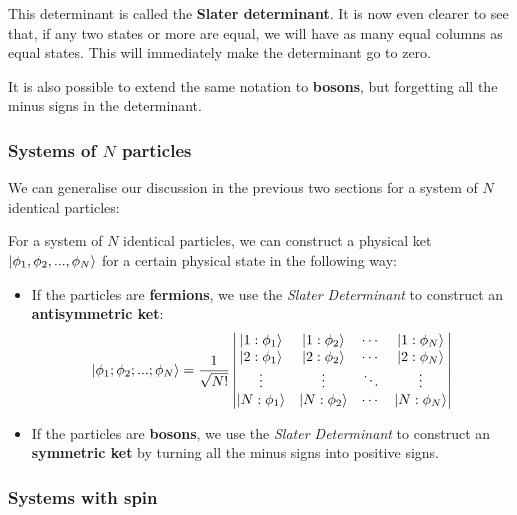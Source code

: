 This determinant is called the \textbf{Slater determinant}. It is now even clearer to see that, if any two states or more are equal, we will have as many equal columns as equal states. This will immediately make the determinant go to zero.

It is also possible to extend the same notation to \textbf{bosons}, but forgetting all the minus signs in the determinant.

\subsubsection{Systems of $N$ particles}

We can generalise our discussion in the previous two sections for a system of $N$ identical particles:

\begin{definition}
    For a system of $N$ identical particles, we can construct a physical ket $\ket{\phi_1,\phi_2,...,\phi_N}$ for a certain physical state in the following way:
    \begin{itemize}
        \item If the particles are \textbf{fermions}, we use the \textit{Slater Determinant} to construct an \textbf{antisymmetric ket}:
        \begin{equation}
            \ket{\phi_1;\phi_2;...;\phi_N} = \frac{1}{\sqrt{N!}}\left|\begin{matrix}
                \ket{1:\phi_1} & \ket{1:\phi_2} & \cdots & \ket{1:\phi_N}\\
                \ket{2:\phi_1} & \ket{2:\phi_2} & \cdots & \ket{2:\phi_N}\\
                \vdots & \vdots & \ddots & \vdots \\
                \ket{N:\phi_1} & \ket{N:\phi_2} & \cdots & \ket{N:\phi_N}\\
            \end{matrix}\right|
        \end{equation}
        \item If the particles are \textbf{bosons}, we use the \textit{Slater Determinant} to construct an \textbf{symmetric ket} by turning all the minus signs into positive signs.
    \end{itemize}
\end{definition}

\subsubsection{Systems with spin}

